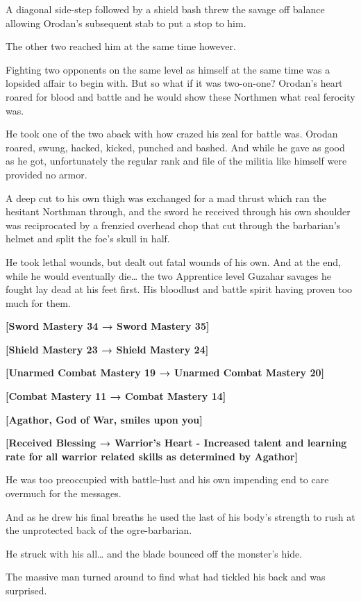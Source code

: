 \documentclass[a4paper,10pt]{book}
\begin{document}
A diagonal side-step followed by a shield bash threw the savage off balance allowing Orodan’s subsequent stab to put a stop to him.\par
The other two reached him at the same time however.\par
Fighting two opponents on the same level as himself at the same time was a lopsided affair to begin with. But so what if it was two-on-one? Orodan’s heart roared for blood and battle and he would show these Northmen what real ferocity was.\par
He took one of the two aback with how crazed his zeal for battle was. Orodan roared, swung, hacked, kicked, punched and bashed. And while he gave as good as he got, unfortunately the regular rank and file of the militia like himself were provided no armor.\par
A deep cut to his own thigh was exchanged for a mad thrust which ran the hesitant Northman through, and the sword he received through his own shoulder was reciprocated by a frenzied overhead chop that cut through the barbarian’s helmet and split the foe’s skull in half.\par
He took lethal wounds, but dealt out fatal wounds of his own. And at the end, while he would eventually die… the two Apprentice level Guzahar savages he fought lay dead at his feet first. His bloodlust and battle spirit having proven too much for them.\par
\textbf{[Sword Mastery 34 → Sword Mastery 35]}\par
\textbf{[Shield Mastery 23 → Shield Mastery 24]}\par
\textbf{[Unarmed Combat Mastery 19 → Unarmed Combat Mastery 20]}\par
\textbf{[Combat Mastery 11 → Combat Mastery 14]}\par
\textbf{[Agathor, God of War, smiles upon you]}\par
\textbf{[Received Blessing → Warrior’s Heart - Increased talent and learning rate for all warrior related skills as determined by Agathor]}\par
He was too preoccupied with battle-lust and his own impending end to care overmuch for the messages.\par
And as he drew his final breaths he used the last of his body’s strength to rush at the unprotected back of the ogre-barbarian.\par
He struck with his all… and the blade bounced off the monster’s hide.\par
The massive man turned around to find what had tickled his back and was surprised.\par
\end{document}
